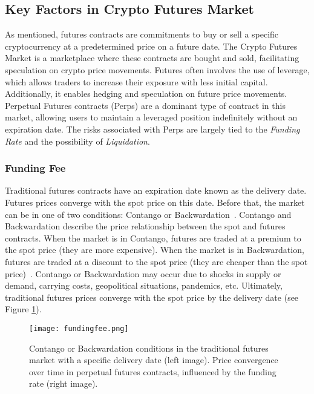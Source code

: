 \subsection{Key Factors in Crypto Futures Market}\label{appx:futures}
As mentioned, futures contracts are commitments to buy or sell a specific cryptocurrency at a predetermined price on a future date. The Crypto Futures Market is a marketplace where these contracts are bought and sold, facilitating speculation on crypto price movements. Futures often involves the use of leverage, which allows traders to increase their exposure with less initial capital. Additionally, it enables hedging and speculation on future price movements. Perpetual Futures contracts (Perps) are a dominant type of contract in this market, allowing users to maintain a leveraged position indefinitely without an expiration date. The risks associated with Perps are largely tied to the \textsl{Funding Rate} and the possibility of \textsl{Liquidation}.

\subsubsection{Funding Fee}\label{appx:funding}
Traditional futures contracts have an expiration date known as the delivery date. Futures prices converge with the spot price on this date. Before that, the market can be in one of two conditions: Contango or Backwardation~\cite{cme2020contango}. Contango and Backwardation describe the price relationship between the spot and futures contracts. When the market is in Contango, futures are traded at a premium to the spot price (\ie they are more expensive). When the market is in Backwardation, futures are traded at a discount to the spot price (\ie they are cheaper than the spot price)~\cite{abd2019contango}. Contango or Backwardation may occur due to shocks in supply or demand, carrying costs, geopolitical situations, pandemics, etc. Ultimately, traditional futures prices converge with the spot price by the delivery date (see Figure \ref{fig:fundingfee}).

\begin{figure}[t]
	\centering
	\texttt{[image: fundingfee.png]}
	\caption{Contango or Backwardation conditions in the traditional futures market with a specific delivery date (left image). Price convergence over time in perpetual futures contracts, influenced by the funding rate (right image).}
	\label{fig:fundingfee}
\end{figure}

